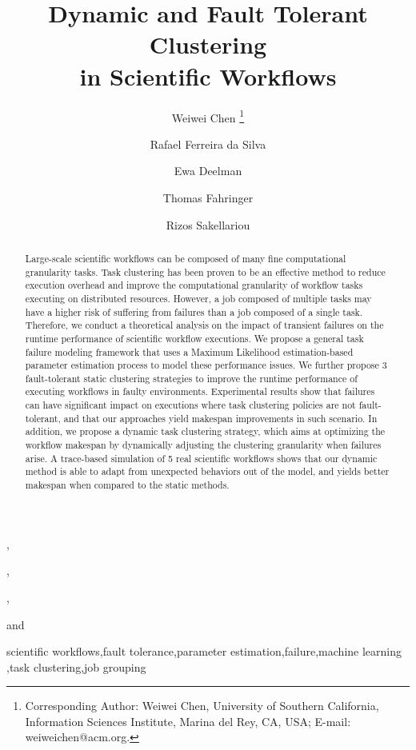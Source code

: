 \documentclass{IOS-Book-Article}
\begin{document}
\begin{frontmatter}              %

\title{Dynamic and Fault Tolerant Clustering\\
  in Scientific Workflows}

\author[A]{{Weiwei} {Chen}%
\thanks{Corresponding Author: Weiwei Chen, University of Southern California, Information Sciences Institute, Marina del Rey, CA, USA; E-mail:
weiweichen@acm.org.}},
\author[A]{Rafael Ferreira da Silva}, 
\author[A]{{Ewa Deelman}},
\author[B]{{Thomas Fahringer}}
and
\author[C]{Rizos Sakellariou}

\address[A]{\small University of Southern California, Information Sciences Institute, Marina del Rey, CA, USA}
\address[B]{\small University of Innsbruck, Institute for Computer Science, Innsbruck, Austria}
\address[C]{\small University of Manchester, School of Computer Science, Manchester, U.K.}

\begin{abstract}
Large-scale scientific workflows can be composed of many fine computational granularity tasks. Task clustering has 
been proven to be an effective method to reduce execution overhead and improve the computational granularity of 
workflow tasks executing on distributed resources. However, a job composed of multiple tasks may have a higher 
risk of suffering from failures than a job composed of a single task. Therefore, we conduct a theoretical analysis on
the impact of transient failures on the runtime performance of scientific workflow executions. We propose a general 
task failure modeling framework that uses a Maximum Likelihood estimation-based parameter estimation process to 
model these performance issues. We further propose 3 fault-tolerant static clustering strategies to improve the runtime 
performance of executing workflows in faulty environments. Experimental results show that failures can have significant 
impact on executions where task clustering policies are not fault-tolerant, and that our approaches yield makespan
improvements in such scenario. In addition, we propose a dynamic task clustering strategy, which aims at optimizing the 
workflow makespan by dynamically adjusting the clustering granularity when failures arise. A trace-based simulation 
of 5 real scientific workflows shows that our dynamic method is able to adapt from unexpected behaviors out of the model,
and yields better makespan when compared to the static methods.
\end{abstract}

\begin{keyword}
scientific workflows\sep fault tolerance\sep parameter estimation\sep failure\sep machine learning \sep task clustering\sep job grouping
\end{keyword}
\end{frontmatter}
\end{document}
